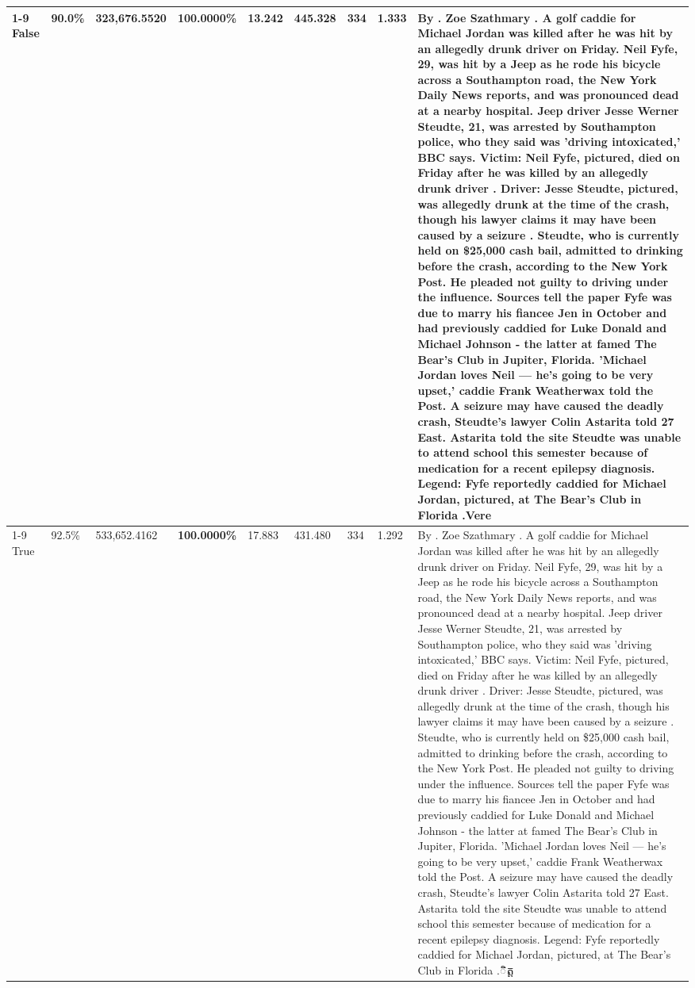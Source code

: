 \begin{table}[H]
\begin{tabular}{lllrlllll}
\cline{1-9}
False & 90.0\% & 323,676.5520 & \bfseries \color{red} 100.0000\% & 13.242 & 445.328 & 334 & 1.333 & By . Zoe Szathmary . A golf caddie for Michael Jordan was killed after he was hit by an allegedly drunk driver on Friday. Neil Fyfe, 29, was hit by a Jeep as he rode his bicycle across a Southampton road, the New York Daily News reports, and was pronounced dead at a nearby hospital. Jeep driver Jesse Werner Steudte, 21, was arrested by Southampton police, who they said was 'driving intoxicated,' BBC says. Victim: Neil Fyfe, pictured, died on Friday after he was killed by an allegedly drunk driver . Driver: Jesse Steudte, pictured, was allegedly drunk at the time of the crash, though his lawyer claims it may have been caused by a seizure . Steudte, who is currently held on \$25,000 cash bail, admitted to drinking before the crash, according to the New York Post. He pleaded not guilty to driving under the influence. Sources tell the paper Fyfe was due to marry his fiancee Jen in October and had previously caddied for Luke Donald and Michael Johnson - the latter at famed The Bear's Club in Jupiter, Florida. 'Michael Jordan loves Neil — he’s going to be very upset,' caddie Frank Weatherwax told the Post. A seizure may have caused the deadly crash, Steudte's lawyer Colin Astarita told 27 East. Astarita told the site Steudte was unable to attend school this semester because of medication for a recent epilepsy diagnosis. Legend: Fyfe reportedly caddied for Michael Jordan, pictured, at The Bear's Club in Florida .Vere \\
\cline{1-9}
True & 92.5\% & 533,652.4162 & \bfseries \color{red} 100.0000\% & 17.883 & 431.480 & 334 & 1.292 & By . Zoe Szathmary . A golf caddie for Michael Jordan was killed after he was hit by an allegedly drunk driver on Friday. Neil Fyfe, 29, was hit by a Jeep as he rode his bicycle across a Southampton road, the New York Daily News reports, and was pronounced dead at a nearby hospital. Jeep driver Jesse Werner Steudte, 21, was arrested by Southampton police, who they said was 'driving intoxicated,' BBC says. Victim: Neil Fyfe, pictured, died on Friday after he was killed by an allegedly drunk driver . Driver: Jesse Steudte, pictured, was allegedly drunk at the time of the crash, though his lawyer claims it may have been caused by a seizure . Steudte, who is currently held on \$25,000 cash bail, admitted to drinking before the crash, according to the New York Post. He pleaded not guilty to driving under the influence. Sources tell the paper Fyfe was due to marry his fiancee Jen in October and had previously caddied for Luke Donald and Michael Johnson - the latter at famed The Bear's Club in Jupiter, Florida. 'Michael Jordan loves Neil — he’s going to be very upset,' caddie Frank Weatherwax told the Post. A seizure may have caused the deadly crash, Steudte's lawyer Colin Astarita told 27 East. Astarita told the site Steudte was unable to attend school this semester because of medication for a recent epilepsy diagnosis. Legend: Fyfe reportedly caddied for Michael Jordan, pictured, at The Bear's Club in Florida .ិត្ត \\

\end{tabular}
\end{table}
